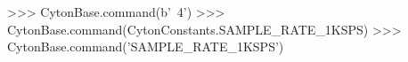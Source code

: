 \begin{python}
>>> CytonBase.command(b'~4')
>>> CytonBase.command(CytonConstants.SAMPLE_RATE_1KSPS)
>>> CytonBase.command('SAMPLE_RATE_1KSPS')
\end{python}